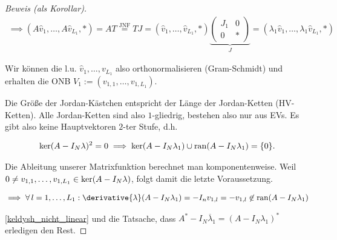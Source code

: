 \begin{proof}[Beweis (als Korollar)]
    \begin{align*}
        \implies
        (A \hat v_1, \dots, A \hat v_{L_1}, \ast)
        =
        A T
        \stackrel
        {
            \text{JNF}
        }{=}
        T J
        =
        (\hat v_1, \dots, \hat v_{L_1}, \ast)
        \underbrace
        {
            \begin{pmatrix}
                J_1 & 0 \\
                0   & \ast
            \end{pmatrix}
        }_J
        =
        (\lambda_1 \hat v_1, \dots, \lambda_1 \hat v_{L_1}, \ast)
    \end{align*}

    Wir können die l.u. $\hat v_1, \dots, v_{L_1}$ also orthonormalisieren (Gram-Schmidt) und erhalten die ONB $V_1 := (v_{1, 1}, \dots, v_{1, L_1})$.

    Die Größe der Jordan-Kästchen entspricht der Länge der Jordan-Ketten (HV-Ketten).
    Alle Jordan-Ketten sind also $1$-gliedrig, bestehen also nur aus  EVs.
    Es gibt also keine Hauptvektoren $2$-ter Stufe, d.h.

    \begin{align*}
        \operatorname{ker}(A - I_N \lambda)^2 = 0
        \implies
        \operatorname{ker}(A - I_N \lambda_1) \cup \operatorname{ran}(A - I_N \lambda_1) = {\left \{ 0 \right \}}.
    \end{align*}

    Die Ableitung unserer Matrixfunktion berechnet man komponentenweise.
    Weil $0 \neq v_{1, 1}, \dots, v_{1, L_1} \in \operatorname{ker}(A - I_N \lambda)$, folgt damit die letzte Voraussetzung.

    \begin{align*}
        \implies
        \Forall l = 1, \dots, L_1:
        \derivative{\lambda} (A - I_N \lambda_1)
        =
        -I_n v_{1, l}
        =
        -v_{1, l}
        \not \in
        \ran(A - I_N \lambda_1)
    \end{align*}

    \ref{keldysh_nicht_linear} und die Tatsache, dass $A^\ast - I_N \overline \lambda_1 = (A - I_N \lambda_1)^\ast$ erledigen den Rest.

\end{proof}


